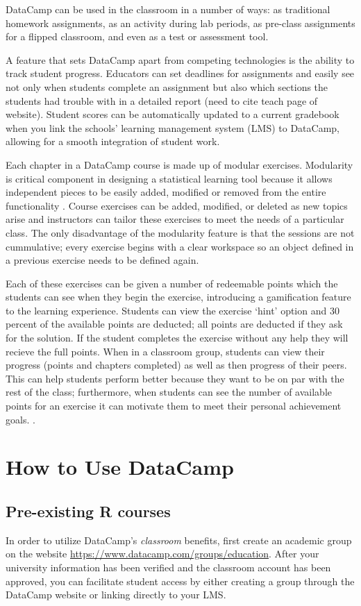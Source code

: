 \documentclass[12pt]{article}
\begin{document}
DataCamp can be used in the classroom in a number of ways: as traditional homework assignments, as an
activity during lab periods, as pre-class assignments for a flipped classroom, and even as a test or assessment tool.

A feature that sets DataCamp apart from competing technologies is the ability to track student progress. Educators
can set deadlines for assignments and easily see not only when students complete an assignment but also which sections the
students had trouble with in a detailed report (need to cite teach page of website). Student scores can be automatically updated to a
current gradebook when you link the schools' learning management system (LMS) to DataCamp, allowing for a smooth integration of student work.

Each chapter in a DataCamp course is made up of modular exercises. Modularity is critical component in designing a statistical
learning tool because it allows independent pieces to be easily added, modified or removed from the entire functionality
\citep{Hare2017}. Course exercises can be added, modified, or deleted as new topics arise and instructors can tailor
these exercises to meet the needs of a particular class. The only disadvantage of the modularity feature is that the sessions
are not cummulative; every exercise begins with a clear workspace so an object defined in a previous exercise needs to be
defined again.

Each of these exercises can be given a number of redeemable points which the students can see when they begin
the exercise, introducing a gamification feature to the learning experience. Students can view the exercise `hint' option and 30 percent
of the available points are deducted; all points are deducted if they ask for the solution.  If the student completes the exercise without
any help they will recieve the full points. When in a classroom group, students can view their
progress (points and chapters completed) as well as then progress of their peers. This can help students perform better
because they want to be on par with the rest of the class; furthermore, when students can see the number of available points
for an exercise it can motivate them to meet their personal achievement goals. \citep{Chang2016}.


\section{How to Use DataCamp}

\subsection{Pre-existing R courses}
In order to utilize 
DataCamp's \textit{classroom} benefits, first create an academic group on the website \url{https://www.datacamp.com/groups/education}.
After your university information has been verified and the classroom account has been approved, you can facilitate student access
by either creating a group through the DataCamp website or linking directly to your LMS.
\end{document}
